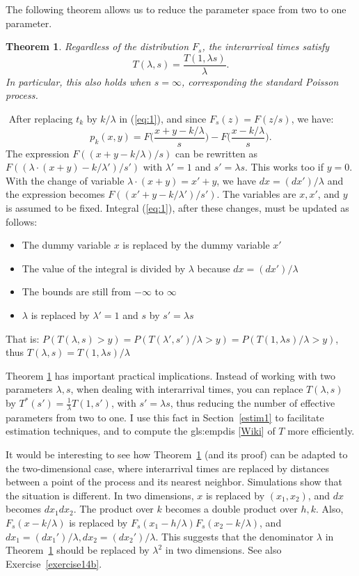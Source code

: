 \documentclass[10pt]{article}
\newtheorem{theorem}{Theorem}[section]
\newenvironment{proof}[1][Proof]{\begin{trivlist}
\item[\hskip \labelsep {\bfseries #1}]}{\end{trivlist}}
\newcommand{\qed}{\nobreak \ifvmode \relax \else
      \ifdim\lastskip<1.5em \hskip-\lastskip
      \hskip1.5em plus0em minus0.5em \fi \nobreak
      \vrule height0.75em width0.5em depth0.25em\fi}
\begin{document}
The following theorem allows us to reduce the parameter space from two to one parameter.

\begin{theorem}
\label{sums}
Regardless of the distribution $F_s$, the interarrival times satisfy
$$T(\lambda,s)=\frac{T(1,\lambda s)}{\lambda}.$$
In particular, this also holds when $s=\infty$, corresponding the standard Poisson process.
\end{theorem}
\begin{proof}
$ $ \newline
After replacing $t_k$ by $k/\lambda$ in (\ref{eq:1}), and since $F_s(z)=F(z/s)$,  we have:
$$p_k(x,y) = F\Big(\frac{x+y-k/\lambda}{ s}\Big)-F\Big(\frac{ x-k/\lambda}{s}\Big).$$
The expression $F((x+y-k/\lambda)/ s)$ can be rewritten as
$F((\lambda\cdot(x+y)-k/\lambda')/ s')$ with $\lambda'=1$ and $s'=\lambda s$. This works too if $y=0$. With the change of variable $\lambda\cdot(x+y)=x'+y$, we have $dx = (dx')/\lambda$ and the expression becomes $F((x'+y-k/\lambda')/ s')$. The variables are $x,x'$, and $y$ is assumed to be fixed.
Integral (\ref{eq:1}), after these changes,  must be updated as follows:
\begin{itemize}
 \item The dummy variable $x$ is replaced by the dummy variable $x'$
 \item The value of the integral is divided by $\lambda$ because $dx =  (dx')/\lambda$
 \item The bounds are still from $-\infty$ to $\infty$
 \item $\lambda$ is replaced by $\lambda'=1$ and $s$ by $s'=\lambda s$
\end{itemize}
That is: $P(T(\lambda,s)>y) = P(T(\lambda',s')/\lambda>y) =P(T(1,\lambda s)/\lambda >y)$, thus
$T(\lambda,s)=T(1,\lambda s)/\lambda$ \qed
\end{proof}

Theorem \ref{sums} has important practical implications. Instead of working with two parameters $\lambda, s$, when dealing with interarrival times, you can replace $T(\lambda,s)$ by $T^*(s')=\frac{1}{\lambda}T(1,s')$, with $s'=\lambda s$, thus reducing the number of effective parameters from two to one. I use this fact in Section~\ref{estim1} to facilitate estimation techniques, and to compute the  \gls{gls:empdis} [\href{https://en.wikipedia.org/wiki/Empirical_distribution_function}{Wiki}]  of $T$ more efficiently.

It would be interesting to see how Theorem~\ref{sums} (and its proof) can be adapted to the two-dimensional case, where interarrival times are replaced by
distances between a point of the process and its \textcolor{index}{nearest neighbor}. Simulations show that the situation is different.
In two dimensions, $x$ is replaced by $(x_1,x_2)$, and $dx$ becomes $dx_1 dx_2$. The product over $k$ becomes a double product over $h,k$. Also, $F_s(x-k/\lambda)$ is replaced by $F_s(x_1-h/\lambda)F_s(x_2-k/\lambda)$, and $dx_1 = (dx_1')/\lambda, dx_2 = (dx_2')/\lambda$. This suggests that the denominator $\lambda$
in Theorem~\ref{sums} should be replaced by $\lambda^2$ in two dimensions. See also Exercise~\ref{exercise14b}.
\end{document}
